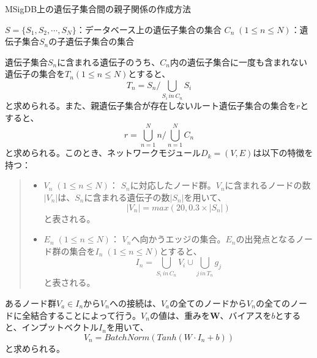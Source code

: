 \documentclass[a4paper,12pt]{jsreport}
\begin{document}
  
 \begin{algorithm}[H]
 \caption{MSigDB上の遺伝子集合間の親子関係の作成方法}
 \begin{algorithmic}[1]
 \renewcommand{\algorithmicrequire}{\textbf{Input:}}
 \renewcommand{\algorithmicensure}{\textbf{Output:}}
 \REQUIRE $S = \{S_1, S_2, \cdots, S_N\}$：データベース上の遺伝子集合の集合
 \ENSURE  $C_n \; (1\leq n\leq N)$：遺伝子集合$S_n$の子遺伝子集合の集合
 \ENDIF
 \ENDFOR
 \ENDFOR
 \end{algorithmic} 
 \end{algorithm}


遺伝子集合$S_n$に含まれる遺伝子のうち、$C_n$内の遺伝子集合に一度も含まれない遺伝子の集合を$T_n(1\leq n\leq N)$とすると、
　$$T_n = S_n / \bigcup_{S_i\, in\, C_n} \! S_i$$
と求められる。また、親遺伝子集合が存在しないルート遺伝子集合の集合を$r$とすると、
　$$r = \bigcup_{n=1}^{N} n / \bigcup_{n=1}^{N} C_n$$
と求められる。このとき、ネットワークモジュール$D_k = (V, E)$は以下の特徴を持つ：

  \begin{quote}
  \begin{itemize}
  \item $V_n \; (1\leq n\leq N)$： $S_n$に対応したノード群。$V_n$に含まれるノードの数$|V_n|$は、$S_n$に含まれる遺伝子の数$|S_n|$を用いて、$$|V_n| = max(20, 0.3 \times |S_n|)$$と表される。
  \item $E_n \; (1\leq n\leq N)$： $V_n$へ向かうエッジの集合。$E_n$の出発点となるノード群の集合を$I_n \; (1\leq n\leq N)$とすると、$$I_n =  \bigcup_{S_i\, in\, C_n}V_i \cup \bigcup_{j\, in\, T_n} g_j$$と表される。
  \end{itemize}
  \end{quote}
 
 あるノード群$V_a \in I_n$から$V_n$への接続は、$V_a$の全てのノードから$V_n$の全てのノードに全結合することによって行う。$V_n$の値は、重みを$\bm{W}$、バイアスを$b$とすると、インプットベクトル$I_n$を用いて、$$V_n = BatchNorm(Tanh(W \cdot I_n + b))$$と求められる。


  
  
  
 
  


 

　
\end{document}
